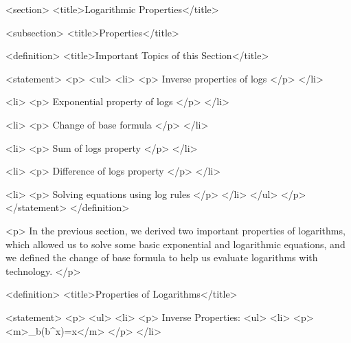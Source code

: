 <section>
    <title>Logarithmic Properties</title>

    <subsection>
        <title>Properties</title>

        <definition>
            <title>Important Topics of this Section</title>

            <statement>
                <p>
                    <ul>
                        <li>
                            <p>
                                Inverse properties of logs
                            </p>
                        </li>

                        <li>
                            <p>
                                Exponential property of logs
                            </p>
                        </li>

                        <li>
                            <p>
                                Change of base formula
                            </p>
                        </li>

                        <li>
                            <p>
                                Sum of logs property
                            </p>
                        </li>

                        <li>
                            <p>
                                Difference of logs property
                            </p>
                        </li>

                        <li>
                            <p>
                                Solving equations using log rules
                            </p>
                        </li>
                    </ul>
                </p>
            </statement>
        </definition>

        <p>
            In the previous section, we derived two important properties of logarithms, which allowed us to solve some basic exponential and logarithmic equations, and we defined the change of base formula to help us evaluate logarithms with technology.
        </p>

        <definition>
            <title>Properties of Logarithms</title>

            <statement>
                <p>
                    <ul>
                        <li>
                            <p>
                                Inverse Properties:
                                <ul>
                                    <li>
                                        <p>
                                            <m>\log_{b}(b^{x})=x</m>
                                        </p>
                                    </li>

